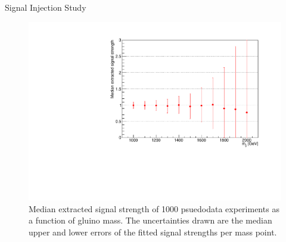 \begin{subsection}{Signal Injection Study}
\begin{figure}[tbp!]
\centering
\includegraphics[angle=0,width=0.80\columnwidth]{fig/sig_injection.pdf}
\caption{Median extracted signal strength of 1000 psuedodata experiments as a function of gluino mass.
The uncertainties drawn are the median upper and lower errors of the fitted signal strengths per mass point.}
\label{fig:sig_injection}
\end{figure}


\end{subsection}
